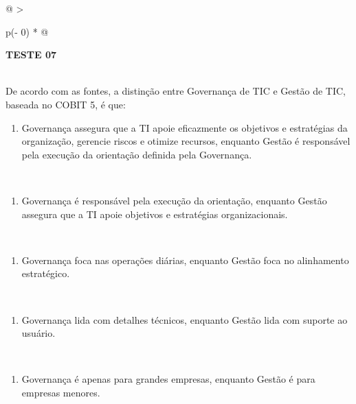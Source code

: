 \documentclass[
]{book}
\providecommand{\tightlist}{%
  \setlength{\itemsep}{0pt}\setlength{\parskip}{0pt}}
\begin{document}
\begin{longtable}[]{@{}
  >{\raggedright\arraybackslash}p{(\columnwidth - 0\tabcolsep) * }@{}}
\toprule\noalign{}
\begin{minipage}[b]{\linewidth}\raggedright
\textbf{TESTE 07}
\end{minipage} \\
\midrule\noalign{}
\endhead
\bottomrule\noalign{}
\endlastfoot
De acordo com as fontes, a distinção entre Governança de TIC e Gestão de TIC, baseada no COBIT 5, é que: \\
\begin{minipage}[t]{\linewidth}\raggedright
\begin{enumerate}
\def\labelenumi{\Alph{enumi})}
\tightlist
\item
  Governança assegura que a TI apoie eficazmente os objetivos e estratégias da organização, gerencie riscos e otimize recursos, enquanto Gestão é responsável pela execução da orientação definida pela Governança.
\end{enumerate}
\end{minipage} \\
\begin{minipage}[t]{\linewidth}\raggedright
\begin{enumerate}
\def\labelenumi{\Alph{enumi})}
\setcounter{enumi}{1}
\tightlist
\item
  Governança é responsável pela execução da orientação, enquanto Gestão assegura que a TI apoie objetivos e estratégias organizacionais.
\end{enumerate}
\end{minipage} \\
\begin{minipage}[t]{\linewidth}\raggedright
\begin{enumerate}
\def\labelenumi{\Alph{enumi})}
\setcounter{enumi}{2}
\tightlist
\item
  Governança foca nas operações diárias, enquanto Gestão foca no alinhamento estratégico.
\end{enumerate}
\end{minipage} \\
\begin{minipage}[t]{\linewidth}\raggedright
\begin{enumerate}
\def\labelenumi{\Alph{enumi})}
\setcounter{enumi}{3}
\tightlist
\item
  Governança lida com detalhes técnicos, enquanto Gestão lida com suporte ao usuário.
\end{enumerate}
\end{minipage} \\
\begin{minipage}[t]{\linewidth}\raggedright
\begin{enumerate}
\def\labelenumi{\Alph{enumi})}
\setcounter{enumi}{4}
\tightlist
\item
  Governança é apenas para grandes empresas, enquanto Gestão é para empresas menores.
\end{enumerate}
\end{minipage} \\
\end{longtable}
\end{document}
